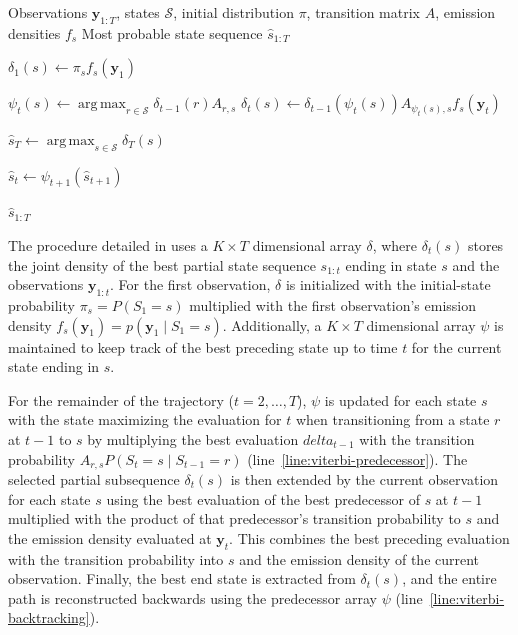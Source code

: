 \begin{algorithm}[htbp]
\caption{Viterbi decoding}
\label{alg:viterbi}
\begin{algorithmic}[1]
\Require Observations $\mathbf y_{1:T}$, states $\mathcal S$,
         initial distribution $\pi$, transition matrix $A$,
         emission densities $f_s$
\Ensure Most probable state sequence $\hat s_{1:T}$

    \State $\delta_1(s)\gets\pi_s f_s(\mathbf y_1)$
\EndFor

        \State $\psi_t(s)\gets
        \operatorname*{arg\,max}_{r\in\mathcal S}
        \delta_{t-1}(r)A_{r,s}$
        \label{line:viterbi-predecessor}
        \State $\delta_t(s)\gets
        \delta_{t-1}(\psi_t(s))
        A_{\psi_t(s),s}f_s(\mathbf y_t)$
    \EndFor
\EndFor

\State $\hat s_T\gets
\operatorname*{arg\,max}_{s\in\mathcal S}\delta_T(s)$

    \State $\hat s_t\gets\psi_{t+1}(\hat s_{t+1})$
    \label{line:viterbi-backtracking}
\EndFor

\State \Return $\hat s_{1:T}$
\end{algorithmic}
\end{algorithm}
The procedure detailed in  uses a $K\times T$ dimensional array $\delta$, where $\delta_t(s)$ stores the joint density of the best partial state sequence $s_{1:t}$ ending in state $s$ and the observations $\mathbf y_{1:t}$.
For the first observation, $\delta$ is initialized with the initial-state probability $\pi_s=P(S_1=s)$ multiplied with the first observation's emission density $f_s(\mathbf y_1)=p(\mathbf y_1\mid S_1=s)$.
Additionally, a $K\times T$ dimensional array $\psi$ is maintained to keep track of the best preceding state up to time $t$ for the current state ending in $s$.

For the remainder of the trajectory ($t=2,\ldots,T$), $\psi$ is updated for each state $s$ with the state maximizing
the evaluation for $t$ when transitioning from a state $r$ at $t-1$ to $s$ by multiplying the best evaluation $delta_{t-1}$ with the transition probability $A_{r,s}P(S_t=s\mid S_{t-1}=r)$ (line~\ref{line:viterbi-predecessor}).
The selected partial subsequence $\delta_t(s)$ is then extended by the current observation for each state $s$ using the best evaluation of the best predecessor of $s$ at $t - 1$ multiplied with the product
of that predecessor's transition probability to $s$ and the emission density evaluated at $\mathbf{y}_t$.
This combines the best preceding evaluation with the transition probability into
$s$ and the emission density of the current observation.
Finally, the best end state is extracted from $\delta_t(s)$, and the entire path is reconstructed backwards using the predecessor array $\psi$ (line~\ref{line:viterbi-backtracking}).

